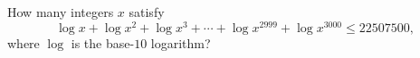How many integers $x$ satisfy
\[
\log x+\log x^2+\log x^3+\cdots+\log x^{2999}+\log x^{3000}\le22507500,
\]
where $\log$ is the base-$10$ logarithm?

